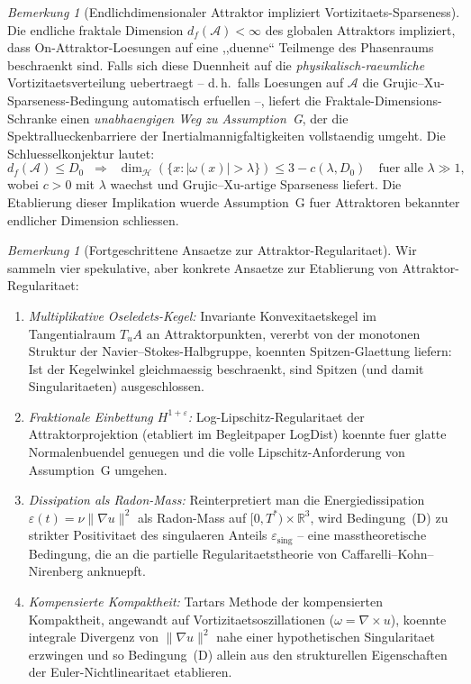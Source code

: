 \documentclass[12pt,a4paper]{article}
\theoremstyle{definition}
\theoremstyle{plain}
\theoremstyle{remark}
\newtheorem{remark}[definition]{Bemerkung}
\begin{document}
\begin{remark}[Endlichdimensionaler Attraktor impliziert
Vortizitaets-Sparseness]
\label{rem:attractor-sparseness}
Die endliche fraktale Dimension $d_f(\mathcal{A}) < \infty$ des globalen
Attraktors impliziert, dass On-Attraktor-Loesungen auf eine ,,duenne``
Teilmenge des Phasenraums beschraenkt sind. Falls sich diese Duennheit
auf die \emph{physikalisch-raeumliche} Vortizitaetsverteilung
uebertraegt -- d.\,h.\ falls Loesungen auf $\mathcal{A}$ die
Grujic--Xu-Sparseness-Bedingung automatisch erfuellen --, liefert die
Fraktale-Dimensions-Schranke einen \emph{unabhaengigen Weg zu
Assumption~G}, der die Spektrallueckenbarriere der
Inertialmannigfaltigkeiten vollstaendig umgeht. Die Schluesselkonjektur
lautet:
\[
  d_f(\mathcal{A}) \leq D_0
  \;\;\Longrightarrow\;\;
  \dim_{\mathcal{H}}(\{x : |\omega(x)| > \lambda\})
  \leq 3 - c(\lambda, D_0)
  \quad\text{fuer alle } \lambda \gg 1,
\]
wobei $c > 0$ mit $\lambda$ waechst und Grujic--Xu-artige Sparseness
liefert. Die Etablierung dieser Implikation wuerde Assumption~G fuer
Attraktoren bekannter endlicher Dimension schliessen.
\end{remark}

\begin{remark}[Fortgeschrittene Ansaetze zur Attraktor-Regularitaet]
\label{rem:advanced-attractor}
Wir sammeln vier spekulative, aber konkrete Ansaetze zur Etablierung von Attraktor-Regularitaet:
\begin{enumerate}
\item \emph{Multiplikative Oseledets-Kegel:} Invariante Konvexitaetskegel im Tangentialraum $T_u A$ an Attraktorpunkten, vererbt von der monotonen Struktur der Navier--Stokes-Halbgruppe, koennten Spitzen-Glaettung liefern: Ist der Kegelwinkel gleichmaessig beschraenkt, sind Spitzen (und damit Singularitaeten) ausgeschlossen.
\item \emph{Fraktionale Einbettung $H^{1+\varepsilon}$:} Log-Lipschitz-Regularitaet der Attraktorprojektion (etabliert im Begleitpaper LogDist) koennte fuer glatte Normalenbuendel genuegen und die volle Lipschitz-Anforderung von Assumption~G umgehen.
\item \emph{Dissipation als Radon-Mass:} Reinterpretiert man die Energiedissipation $\varepsilon(t) = \nu \|\nabla u\|^2$ als Radon-Mass auf $[0, T^*) \times \mathbb{R}^3$, wird Bedingung~(D) zu strikter Positivitaet des singulaeren Anteils $\varepsilon_{\mathrm{sing}}$ -- eine masstheoretische Bedingung, die an die partielle Regularitaetstheorie von Caffarelli--Kohn--Nirenberg anknuepft.
\item \emph{Kompensierte Kompaktheit:} Tartars Methode der kompensierten Kompaktheit, angewandt auf Vortizitaetsoszillationen ($\omega = \nabla \times u$), koennte integrale Divergenz von $\|\nabla u\|^2$ nahe einer hypothetischen Singularitaet erzwingen und so Bedingung~(D) allein aus den strukturellen Eigenschaften der Euler-Nichtlinearitaet etablieren.
\end{enumerate}
\end{remark}
\end{document}
